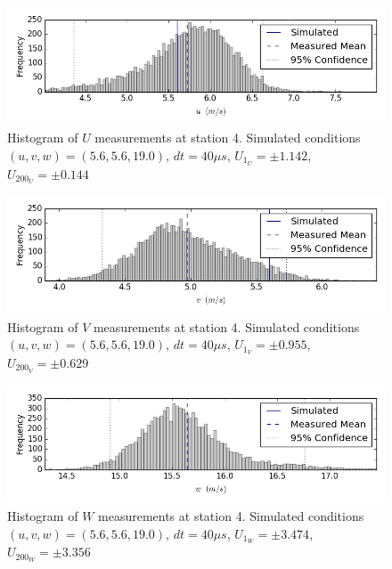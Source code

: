 \begin{figure}[H]
\centering
\includegraphics[width=6in]{figs/Ely_May28th04002/uncertainty_Ely_May28th04002_U}
\caption{Histogram of $U$ measurements at station 4. Simulated conditions $(u,v,w)=(5.6, 5.6, 19.0)$, $dt=40 \mu s$, $U_1_U=\pm 1.142$, $U_200_U=\pm 0.144$}
\label{fig:uncertainty_Ely_May28th04002_U}
\end{figure}


\begin{figure}[H]
\centering
\includegraphics[width=6in]{figs/Ely_May28th04002/uncertainty_Ely_May28th04002_V}
\caption{Histogram of $V$ measurements at station 4. Simulated conditions $(u,v,w)=(5.6, 5.6, 19.0)$, $dt=40 \mu s$, $U_1_V=\pm 0.955$, $U_200_V=\pm 0.629$}
\label{fig:uncertainty_Ely_May28th04002_V}
\end{figure}


\begin{figure}[H]
\centering
\includegraphics[width=6in]{figs/Ely_May28th04002/uncertainty_Ely_May28th04002_W}
\caption{Histogram of $W$ measurements at station 4. Simulated conditions $(u,v,w)=(5.6, 5.6, 19.0)$, $dt=40 \mu s$, $U_1_W=\pm 3.474$, $U_200_W=\pm 3.356$}
\label{fig:uncertainty_Ely_May28th04002_W}
\end{figure}


